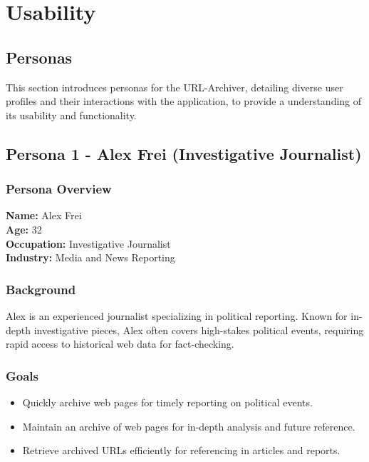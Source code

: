 
\section{Usability}

\subsection{Personas}
This section introduces personas for the URL-Archiver, detailing diverse user profiles and their interactions with the application, to provide a understanding of its usability and functionality.

\clearpage
\subsection{Persona 1 - Alex Frei (Investigative Journalist)}

\subsubsection{Persona Overview}

\textbf{Name:} Alex Frei \\
\textbf{Age:} 32 \\
\textbf{Occupation:} Investigative Journalist \\
\textbf{Industry:} Media and News Reporting

\subsubsection{Background}
Alex is an experienced journalist specializing in political reporting.
Known for in-depth investigative pieces, Alex often covers high-stakes political events, requiring rapid access to historical web data for fact-checking.

\subsubsection{Goals}
\begin{itemize}
    \item Quickly archive web pages for timely reporting on political events.
    \item Maintain an archive of web pages for in-depth analysis and future reference.
    \item Retrieve archived URLs efficiently for referencing in articles and reports.
\end{itemize}

